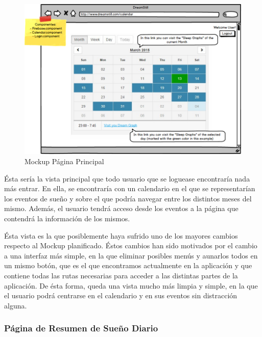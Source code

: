 \documentclass[11pt,openany]{book}
\begin{document}
\begin{figure}[H]
\centering
\includegraphics[totalheight=6.5cm]{mockups/CalendarPage.png}
\caption{Mockup Página Principal}
\end{figure}
\par\bigskip 
\noindent

Ésta sería la vista principal que todo usuario que se loguease encontraría nada más entrar. En ella, se encontraría con un calendario en el que se representarían los eventos de sueño y sobre el que podría navegar entre los distintos meses del mismo. Además, el usuario tendrá acceso desde los eventos a la página que contendrá la información de los mismos.

Ésta vista es la que posiblemente haya sufrido uno de los mayores cambios respecto al Mockup planificado. Éstos cambios han sido motivados por el cambio a una interfaz más simple, en la que eliminar posibles menús y aunarlos todos en un mismo botón, que es el que encontramos actualmente en la aplicación y que contiene todas las rutas necesarias para acceder a las distintas partes de la aplicación. De ésta forma, queda una vista mucho más limpia y simple, en la que el usuario podrá centrarse en el calendario y en sus eventos sin distracción alguna.

\subsubsection{Página de Resumen de Sueño Diario}
\end{document}
